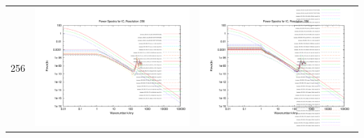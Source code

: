 \begin{itemize}
\begin{table}
\begin{tabular}{l|c|c}
 256 & \includegraphics[scale=0.2]{analysis/powerspectra/IC_powspec_combined_256_h70.pdf} & \includegraphics[scale=0.2]{analysis/powerspectra/IC_powspec_combined_256_h100.pdf} \\

\end{tabular}
\end{table}
\end{itemize}

